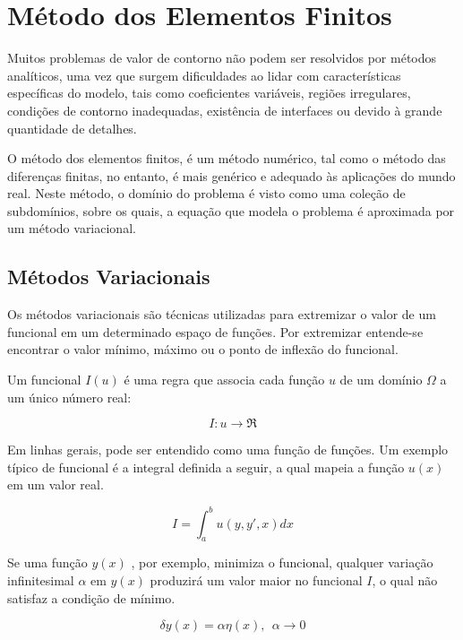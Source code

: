 \section{Método dos Elementos Finitos}

Muitos problemas de valor de contorno não podem ser resolvidos por métodos analíticos, uma vez que surgem dificuldades ao lidar com características específicas do modelo, tais como coeficientes variáveis, regiões irregulares, condições de contorno inadequadas, existência de interfaces ou devido à grande quantidade de detalhes.
\citep[p. 410]{powers}

O método dos elementos finitos, é um método numérico, tal como o método das diferenças finitas, no entanto, é mais genérico e adequado às aplicações do mundo real. Neste método, o domínio do problema é visto como uma coleção de subdomínios, sobre os quais, a equação que modela o problema é aproximada por um método variacional.
\citep[p. 13]{reddy}

\subsection{Métodos Variacionais}
Os métodos variacionais são técnicas utilizadas para extremizar o valor de um funcional em um determinado espaço de funções. Por extremizar entende-se encontrar o valor mínimo, máximo ou o ponto de inflexão do funcional.

Um funcional $ I(u) $ é uma regra que associa cada função $ u $ de um domínio $ \Omega $ a um único número real:

\begin{equation}
I : u \rightarrow \Re
\end{equation}

Em linhas gerais, pode ser entendido como uma função de funções. Um exemplo típico de funcional é a integral definida a seguir, a qual mapeia a função $ u(x) $ em um valor real.

\begin{equation}
\label{eq:funcional}
I = \int_{a}^{b} u(y, y', x) dx
\end{equation}

Se uma função $ y(x) $ , por exemplo, minimiza o funcional, qualquer variação infinitesimal $ \alpha $ em $ y(x) $ produzirá um valor maior no funcional $ I $, o qual não satisfaz a condição de mínimo.

\begin{equation}
\delta y(x) = \alpha \eta(x), \ \  \alpha \rightarrow 0
\end{equation}


